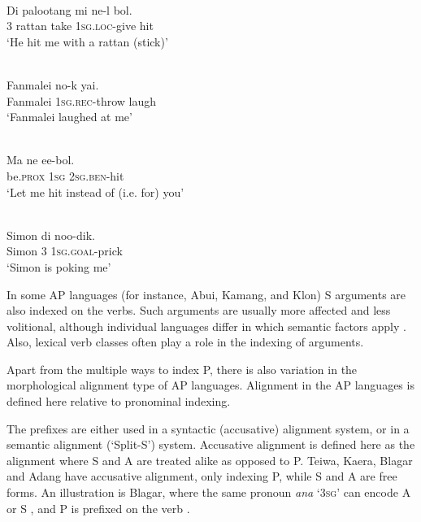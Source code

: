  

\ea%
\label{ex:1:9}
 \\
\gll Di   palootang   mi   ne-l     bol.  \\
 3   rattan     take   \textsc{1sg.loc-}give  hit  \\
\glt  `He hit me with a rattan (stick)'
\z
 

\ea%
\label{ex:1:10}
 \\
\gll Fanmalei   no-k       yai.  \\
Fanmalei   \textsc{1sg.rec-}throw   laugh   \\
\glt  `Fanmalei  laughed at me'
\z
 


\ea%
\label{ex:1:11}
 \\
\gll Ma     ne   ee-bol. \\
 be.\textsc{prox}   \textsc{1sg}   \textsc{2sg.ben}{}-hit  \\
\glt  `Let me hit instead of (i.e. for) you'
\z
 





\ea%
\label{ex:1:12}
 \\
\gll Simon   di   noo-dik. \\
 Simon   3   \textsc{1sg.goal}{}-prick  \\
\glt `Simon is poking me'
\z
 




In some AP languages (for instance, Abui, Kamang, and Klon) S arguments are also indexed on the verbs. Such arguments are usually more affected and less volitional, although individual languages differ in which semantic factors apply \citep{FeddenEtAlTV,FeddenEtAl2014}. Also, lexical verb classes often play a role in the indexing of arguments. 

Apart from the multiple ways to index P, there is also variation in the morphological alignment type of AP languages. Alignment in the AP languages is defined here relative to pronominal indexing. 

The prefixes are either used in a syntactic (accusative) alignment system, or in a semantic alignment (`Split-S') system. Accusative alignment is defined here as the alignment where S and A are treated alike as opposed to P. Teiwa, Kaera, Blagar and Adang have accusative alignment, only indexing P, while S and A are free forms. An illustration is Blagar, where the same pronoun \textit{{\textglotstop}}\textit{ana} `3\textsc{sg}' can encode A  or S , and P is prefixed on the verb .



